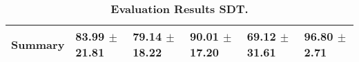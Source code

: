 \begin{table}[htb]
{\begin{tabular}{llllll}
\midrule
\textbf{Summary                                  } &                  \phantom{0}83.99 $\pm$ 21.81 &                      \phantom{0}79.14 $\pm$ 18.22 &                  \phantom{0}90.01 $\pm$ 17.20 &                  \phantom{0}69.12 $\pm$ 31.61 &  \phantom{0}96.80 $\pm$ \phantom{0}2.71 \\
\bottomrule
\end{tabular}%
}
\caption{\textbf{Evaluation Results SDT.}}
\label{tab:eval-results}
\end{table}
\newpage 
